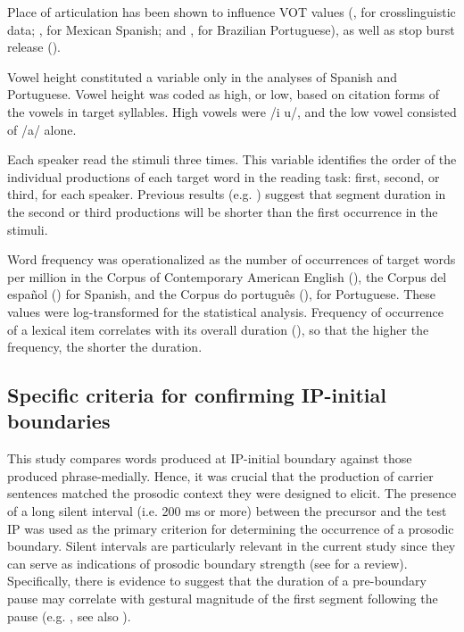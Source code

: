 \documentclass[output=paper]{langscibook}
\begin{document}
Place of articulation has been shown to influence VOT values (\citealt{cl99}, for crosslinguistic data; \citealt{Avelino18}, for Mexican Spanish; and \citealt{Ahn18}, for Brazilian Portuguese), as well as stop burst release (\citealt{wsr72}).

Vowel height constituted a variable only in the analyses of Spanish and Portuguese. Vowel height was coded as high, or low, based on citation forms of the vowels in target syllables. High vowels were /i u/, and the low vowel consisted of /a/ alone. 

Each speaker read the stimuli three times. This variable identifies the order of the individual productions of each target word in the reading task: first, second, or third, for each speaker. Previous results (e.g. \citealt{fh87}) suggest that segment duration in the second or third productions will be shorter than the first occurrence in the stimuli.

Word frequency was operationalized as the number of 
occurrences of target words per million in the Corpus of Contemporary American English (\citealt{d}), the Corpus del español (\citealt{d6}) for Spanish, and the Corpus do português (\citealt{df06}), for Portuguese. These values were log-trans\-formed for the statistical analysis. Frequency of occurrence of a lexical item correlates with its overall duration (\citealt{bbggj09}), so that the higher the frequency, the shorter the duration.


\subsection{Specific criteria for confirming IP-initial boundaries}
This study compares words produced at IP-initial boundary against those produced phrase-medially. Hence, it was crucial that the production of carrier sentences matched the prosodic context they were designed to elicit. The presence of a long silent interval (i.e. 200 ms or more) between the precursor and the test IP was used as the primary criterion for determining the occurrence of a prosodic boundary. Silent intervals are particularly relevant in the current study since they can serve as indications of prosodic boundary strength (see \citealt{k14} for a review). Specifically, there is evidence to suggest that the duration of a pre-boundary pause may correlate with gestural magnitude of the first segment following the pause (e.g. \citealt{Be}, see also \citealt{rbbgn09}).
\end{document}
